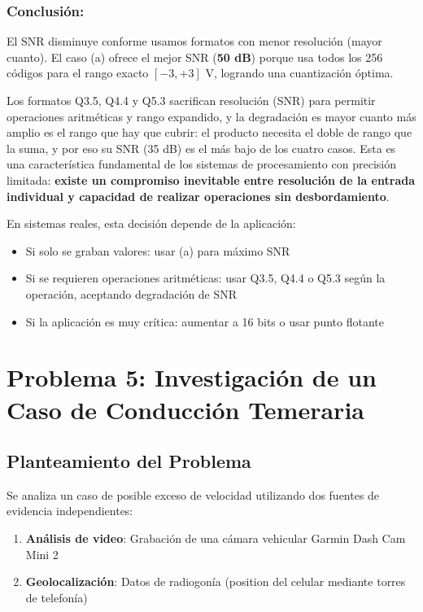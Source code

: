 \documentclass[12pt]{article}
\begin{document}
\subsubsection*{Conclusión:}
 
El SNR disminuye conforme usamos formatos con menor resolución (mayor cuanto). El caso (a) ofrece el mejor SNR (\textbf{50 dB}) porque usa todos los 256 códigos para el rango exacto $[-3, +3]$ V, logrando una cuantización óptima.
 
Los formatos Q3.5, Q4.4 y Q5.3 sacrifican resolución (SNR) para permitir operaciones aritméticas y rango expandido, y la degradación es mayor cuanto más amplio es el rango que hay que cubrir: el producto necesita el doble de rango que la suma, y por eso su SNR (35 dB) es el más bajo de los cuatro casos. Esta es una característica fundamental de los sistemas de procesamiento con precisión limitada: \textbf{existe un compromiso inevitable entre resolución de la entrada individual y capacidad de realizar operaciones sin desbordamiento}.

En sistemas reales, esta decisión depende de la aplicación:
\begin{itemize}
    \item Si solo se graban valores: usar (a) para máximo SNR
    \item Si se requieren operaciones aritméticas: usar Q3.5, Q4.4 o Q5.3 según la operación, aceptando degradación de SNR
    \item Si la aplicación es muy crítica: aumentar a 16 bits o usar punto flotante
\end{itemize}





\section{Problema 5: Investigación de un Caso de Conducción Temeraria}

\subsection*{Planteamiento del Problema}

Se analiza un caso de posible exceso de velocidad utilizando dos fuentes de evidencia independientes:

\begin{enumerate}
    \item \textbf{Análisis de video}: Grabación de una cámara vehicular Garmin Dash Cam Mini 2
    \item \textbf{Geolocalización}: Datos de radiogonía (position del celular mediante torres de telefonía)
\end{enumerate}
\end{document}
